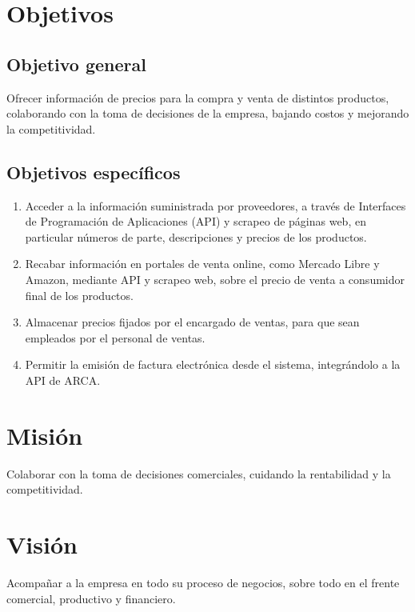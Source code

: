 \section{Objetivos}

\subsection{Objetivo general}

Ofrecer información de precios para la compra y venta de distintos productos,
colaborando con la toma de decisiones de la empresa, bajando costos y mejorando la competitividad.

\subsection{Objetivos específicos}

\begin{enumerate}
	\item Acceder a la información suministrada por proveedores,
	      a través de Interfaces de Programación de Aplicaciones (API) y scrapeo de páginas web,
	      en particular números de parte, descripciones y precios de los productos.
	\item Recabar información en portales de venta online, 
		  como Mercado Libre y Amazon,
		  mediante API y scrapeo web,
	      sobre el precio de venta a consumidor final de los productos.
	\item Almacenar precios fijados por el encargado de ventas,
	      para que sean empleados por el personal de ventas.
	\item Permitir la emisión de factura electrónica desde el sistema,
	      integrándolo a la API de ARCA.
\end{enumerate}

\section{Misión}

Colaborar con la toma de decisiones comerciales,
cuidando la rentabilidad y la competitividad.

\section{Visión}

Acompañar a la empresa en todo su proceso de negocios,
sobre todo en el frente comercial, productivo y financiero.